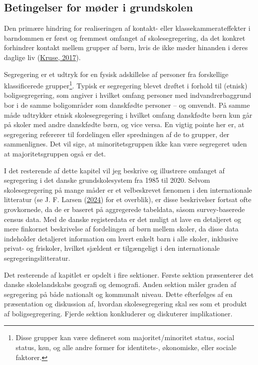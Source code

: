 \documentclass[
]{book}
\begin{document}
\hypertarget{betingelser-for-muxf8der-i-grundskolen}{%
\subsection{Betingelser for møder i grundskolen}\label{betingelser-for-muxf8der-i-grundskolen}}

Den primære hindring for realiseringen af kontakt- eller klassekammerateffekter i barndommen er først og fremmest omfanget af skolesegregering, da det konkret forhindrer kontakt mellem grupper af børn, hvis de ikke møder hinanden i deres daglige liv (\protect\hyperlink{ref-kruse2017}{Kruse, 2017}).

Segregering er et udtryk for en fysisk adskillelse af personer fra forskellige klassificerede grupper\footnote{Disse grupper kan være defineret som majoritet/minoritet status, social status, køn, og alle andre former for identitets-, økonomiske, eller sociale faktorer.}. Typisk er segregering blevet drøftet i forhold til (etnisk) boligsegregering, som angiver i hvilket omfang personer med indvandrerbaggrund bor i de samme boligområder som danskfødte personer -- og omvendt. På samme måde udtrykker etnisk skolesegregering i hvilket omfang danskfødte børn kun går på skoler med andre danskfødte børn, og vice versa. En vigtig pointe her er, at segregering refererer til fordelingen eller spredningen af de to grupper, der sammenlignes. Det vil sige, at minoritetsgruppen ikke kan være segregeret uden at majoritetsgruppen også er det.

I det resterende af dette kapitel vil jeg beskrive og illustrere omfanget af segregering i det danske grundskolesystem fra 1985 til 2020. Selvom skolesegregering på mange måder er et velbeskrevet fænomen i den internationale litteratur (se J. F. Larsen (\protect\hyperlink{ref-larsen2024a}{2024}) for et overblik), er disse beskrivelser fortsat ofte grovkornede, da de er baseret på aggregerede tabeldata, såsom survey-baserede census data. Med de danske registerdata er det muligt at lave en detaljeret og mere finkornet beskrivelse af fordelingen af børn mellem skoler, da disse data indeholder detaljeret information om hvert enkelt barn i alle skoler, inklusive privat- og friskoler, hvilket sjældent er tilgængeligt i den internationale segregeringslitteratur.

Det resterende af kapitlet er opdelt i fire sektioner. Første sektion præsenterer det danske skolelandskabs geografi og demografi. Anden sektion måler graden af segregering på både nationalt og kommunalt niveau. Dette efterfølges af en præsentation og diskussion af, hvordan skolesegregering skal ses som et produkt af boligsegregering. Fjerde sektion konkluderer og diskuterer implikationer.
\end{document}
